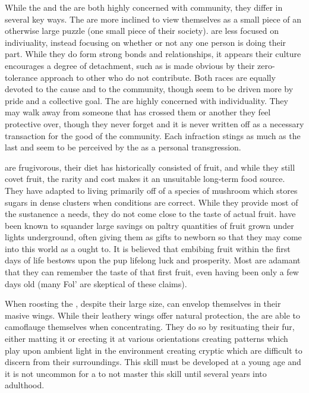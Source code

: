 \documentclass[twoside, 12pt, letterpaper]{report}\usepackage[]{graphicx}\usepackage[]{color}
\begin{document}
\begin{multicols*}{2}
While the \vmbat and the \ftbat are both highly concerned with community, they differ in several key ways. The \vmbat are more inclined to view themselves as a small piece of an otherwise large puzzle (one small piece of their society). \vmbat are less focused on indiviuality, instead focusing on whether or not any one person is doing their part. While they do form strong bonds and relationships, it appears their culture encourages a degree of detachment, such as is made obvious by their zero-tolerance approach to other \vmbat who do not contribute. Both races are equally devoted to the cause and to the community, though \vmbat seem to be driven more by pride and a collective goal. The \ftbat are highly concerned with individuality. They may walk away from someone that has crossed them or another they feel protective over, though they never forget and it is never written off as a necessary transaction for the good of the community. Each infraction stings as much as the last and seem to be perceived by the \ftbat as a personal transgression.

\ftbat are frugivorous, their diet has historically consisted of fruit, and while they still covet fruit, the rarity and cost makes it an unsuitable long-term food source. They have adapted to living primarily off of a species of mushroom which stores sugars in dense clusters when conditions are correct. While they provide most of the sustanence a \ftbat needs, they do not come close to the taste of actual fruit. \ftbat have been known to squander large savings on paltry quantities of fruit grown under lights underground, often giving them as gifts to newborn \ftbat so that they may come into this world as a \ftbat ought to. It is believed that embibing fruit within the first days of life bestows upon the pup lifelong luck and prosperity. Most \ftbat are adamant that they can remember the taste of that first fruit, even having been only a few days old (many Fol' are skeptical of these claims).

When roosting the \ftbat, despite their large size, can envelop themselves in their masive wings. While their leathery wings offer natural protection, the \ftbat are able to camoflauge themselves when concentrating. They do so by resituating their fur, either matting it or erecting it at various orientations creating patterns which play upon ambient light in the environment creating cryptic which are difficult to discern from their surroundings. This skill must be developed at a young age and it is not uncommon for a \ftbat to not master this skill until several years into adulthood.
 

\end{multicols*}
\end{document}
